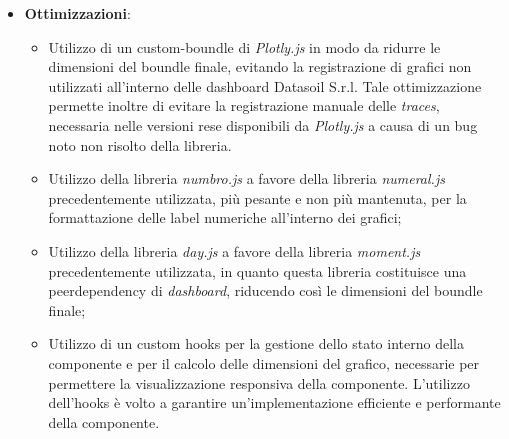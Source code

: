 \begin{itemize}
\begin{listing}[H]
\begin{verbatim}
                  \end{verbatim}
                  \caption{Definizione delle props della componente Chart}
                  \label{listing:chartProps}
            \end{listing}
      \item \textbf{Ottimizzazioni}:
            \begin{itemize}
                  \item Utilizzo di un custom-boundle di \textit{Plotly.js} in modo da ridurre le dimensioni del boundle finale, evitando la registrazione
                        di grafici non utilizzati all'interno delle dashboard Datasoil S.r.l. Tale ottimizzazione permette inoltre di evitare la registrazione
                        manuale delle \textit{traces}, necessaria nelle versioni rese disponibili da \textit{Plotly.js} a causa di un bug noto non risolto della libreria.
                  \item Utilizzo della libreria \textit{numbro.js} a favore della libreria \textit{numeral.js} precedentemente utilizzata, più pesante e non più mantenuta,
                        per la formattazione delle label numeriche all'interno dei grafici;
                  \item Utilizzo della libreria \textit{day.js} a favore della libreria \textit{moment.js} precedentemente utilizzata, in quanto questa libreria costituisce una
                        peerdependency di \textit{dashboard}, riducendo così le dimensioni del boundle finale;
                  \item Utilizzo di un custom hooks per la gestione dello stato interno della componente e per il calcolo delle dimensioni del grafico, necessarie per permettere
                        la visualizzazione responsiva della componente. L'utilizzo dell'hooks è volto a garantire un'implementazione efficiente e performante della componente.
            \end{itemize}
\end{itemize}

